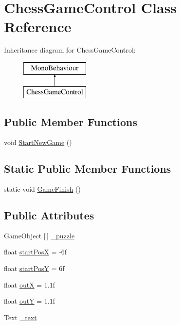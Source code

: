 \hypertarget{class_chess_game_control}{}\section{Chess\+Game\+Control Class Reference}
\label{class_chess_game_control}
Inheritance diagram for Chess\+Game\+Control\+:\begin{figure}[H]
\begin{center}
\leavevmode
\includegraphics[height=2.000000cm]{class_chess_game_control}
\end{center}
\end{figure}
\subsection*{Public Member Functions}
\begin{DoxyCompactItemize}
\item 
void \mbox{\hyperlink{class_chess_game_control_affafb753ad71eda5251f7945674298d9}{Start\+New\+Game}} ()
\end{DoxyCompactItemize}
\subsection*{Static Public Member Functions}
\begin{DoxyCompactItemize}
\item 
static void \mbox{\hyperlink{class_chess_game_control_a3729a1181e9013740d165af9de103390}{Game\+Finish}} ()
\end{DoxyCompactItemize}
\subsection*{Public Attributes}
\begin{DoxyCompactItemize}
\item 
Game\+Object \mbox{[}$\,$\mbox{]} \mbox{\hyperlink{class_chess_game_control_afbb50d0fa87fbfd950b0c393f96b6bd5}{\+\_\+puzzle}}
\item 
float \mbox{\hyperlink{class_chess_game_control_a4418745fbd1dbff6ab10651da41f0fba}{start\+PosX}} = -\/6f
\item 
float \mbox{\hyperlink{class_chess_game_control_af53f18006dd9f5e14f84c8af7b8f18e6}{start\+PosY}} = 6f
\item 
float \mbox{\hyperlink{class_chess_game_control_a3415ff724cb50abbbc9a23336f6d2a93}{outX}} = 1.\+1f
\item 
float \mbox{\hyperlink{class_chess_game_control_a45bbddf6cacb5b0a01a2d938e7ad19b3}{outY}} = 1.\+1f
\item 
Text \mbox{\hyperlink{class_chess_game_control_afa13ec262edb1f71890c4b01898b9c19}{\+\_\+text}}
\end{DoxyCompactItemize}
